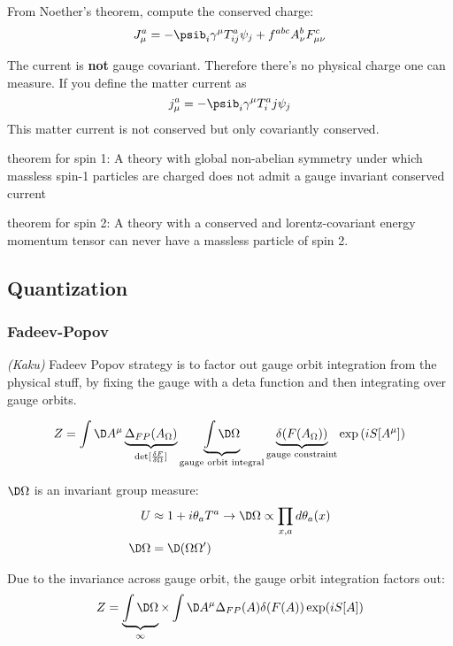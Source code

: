 \documentclass[11pt]{scrartcl}
\begin{document}
From Noether's theorem, compute the conserved charge:
\[J_\mu^a = - \psib_i \gamma^\mu T^{a}_{ij} \psi_j  + f^{abc} A^{b}_\nu F^c_{\mu \nu}\]

The current is \textbf{not} gauge covariant.  Therefore there's no physical charge one can measure.  
If you define the matter current as
\[j^{a}_\mu = - \psib_i \gamma^\mu T^{a}_ij \psi_j\]
This matter current is not conserved but only covariantly conserved.

\begin{theorem}
	 theorem for spin 1: A theory with global non-abelian symmetry under which massless spin-1 particles are charged does not admit a gauge invariant conserved current
	\end{theorem}

\begin{theorem}
	 theorem for spin 2: A theory with a conserved and lorentz-covariant energy momentum tensor can never have a massless particle of spin 2.
	\end{theorem}

\subsection{Quantization}
\subsubsection{Fadeev-Popov}
\emph{(Kaku)}
Fadeev Popov strategy is to factor out gauge orbit integration from the physical stuff, by fixing the gauge with a deta function and then integrating over gauge orbits.

\[ Z = \int \D A^\mu \underbrace{\Delta_{FP}(A_\Omega)}_{\mathrm{det}[{\delta F \over \delta \Omega}]} \underbrace{\int \D \Omega}_{\text{gauge orbit integral}} \underbrace{\delta(F(A_\Omega))}_{\text{gauge constraint}} \exp \left( i S[A^\mu ]\right) \]


$\D \Omega$ is an invariant group measure:
\begin{align}
	U &\approx 1 + i \theta_a T^a \rightarrow \D \Omega \propto \prod_{x, a} d \theta_a(x) \\
	\D \Omega &= \D (\Omega \Omega')
	\end{align}

Due to the invariance across gauge orbit, the gauge orbit integration factors out:
\[Z = \underbrace{\int \D \Omega}_{\infty} \times \int \D A^\mu \Delta_{FP}(A) \delta(F(A)) \exp(i S[A])  \]
\end{document}
